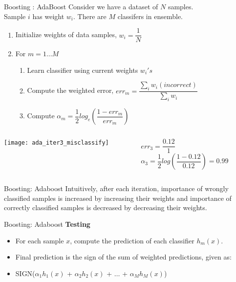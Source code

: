\documentclass{beamer}
\begin{document}
\begin{frame}{Boosting : AdaBoost }
  Consider we have a dataset of $N$ samples.\\
  Sample $i$ has weight $w_i$. There are $M$ classifers in ensemble.\\
  \begin{enumerate}
    \item Initialize weights of data samples, $w_i = \dfrac{1}{N}$
    \item For $m = 1\dots M$
          \begin{enumerate}
            \item Learn classifier using current weights $w_i's$
            \item Compute the weighted error, $err_m = \dfrac{\sum\limits_iw_i(incorrect)}{\sum\limits_iw_i}$
            \item Compute $\alpha_m = \dfrac{1}{2}log_e\left(\dfrac{1 - err_m}{err_m}\right)$
          \end{enumerate}
  \end{enumerate}
  \begin{columns}
    \begin{column}{0.5\textwidth}
      \centering
      \texttt{[image: ada\_iter3\_misclassify]}
    \end{column}
    \begin{column}{0.5\textwidth}
      $err_3 = \dfrac{0.12}{1}$\\
      $\alpha_3 = \dfrac{1}{2}log\left(\dfrac{1-0.12}{0.12}\right) = 0.99$
    \end{column}
  \end{columns}
\end{frame}

\begin{frame}{Boosting: Adaboost}
  Intuitively, after each iteration, importance of wrongly classified samples is increased by increasing their weights and importance of correctly classified     samples is decreased by decreasing their weights.
\end{frame}

\begin{frame}{Boosting: Adaboost}
  \textbf{Testing}\\
  \begin{itemize}
	\item For each sample $x$, compute the prediction of each classifier $h_m(x)$.
	\item Final prediction is the sign of the sum of weighted predictions, given as:
	\item SIGN($\alpha_1 h_1(x)$ +  $\alpha_2 h_2(x)$ + $\dots$ +  $\alpha_M h_M(x)$)
  \end{itemize}

\end{frame}
\end{document}
